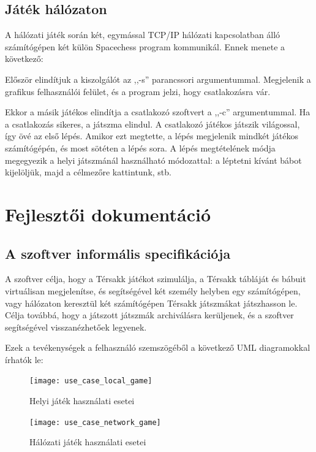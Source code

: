 \documentclass[12pt, twoside]{report}
\begin{document}
\section{Játék hálózaton}

A hálózati játék során két, egymással TCP/IP hálózati kapcsolatban álló számítógépen két külön Spacechess program kommunikál. Ennek menete a következő:

Először elindítjuk a kiszolgálót az ,,-s'' parancssori argumentummal. Megjelenik a grafikus felhasználói felület, és a program jelzi, hogy csatlakozásra vár.

Ekkor a másik játékos elindítja a csatlakozó szoftvert a ,,-c'' argumentummal. Ha a csatlakozás sikeres, a játszma elindul. A csatlakozó játékos játszik világossal, így övé az első lépés. Amikor ezt megtette, a lépés megjelenik mindkét játékos számítógépén, és most sötéten a lépés sora. A lépés megtételének módja megegyezik a helyi játszmánál használható módozattal: a léptetni kívánt bábot kijelöljük, majd a célmezőre kattintunk, stb.

\chapter{Fejlesztői dokumentáció}

\section{A szoftver informális specifikációja}

A szoftver célja, hogy a Térsakk játékot szimulálja, a Térsakk tábláját és bábuit virtuálisan megjelenítse, és segítségével két személy helyben egy számítógépen, vagy hálózaton keresztül két számítógépen Térsakk játszmákat játszhasson le. Célja továbbá, hogy a játszott játszmák archiválásra kerüljenek, és a szoftver segítségével vissza\-néz\-he\-tő\-ek legyenek.

Ezek a tevékenységek a felhasználó szemszögéből a következő UML diagramokkal írhatók le:

\begin{figure}
	\begin{center}
		\texttt{[image: use\_case\_local\_game]}
	\end{center}
	\caption{Helyi játék használati esetei}
\end{figure}

\begin{figure}
	\begin{center}
		\texttt{[image: use\_case\_network\_game]}
	\end{center}
	\caption{Hálózati játék használati esetei}
\end{figure}
\end{document}

